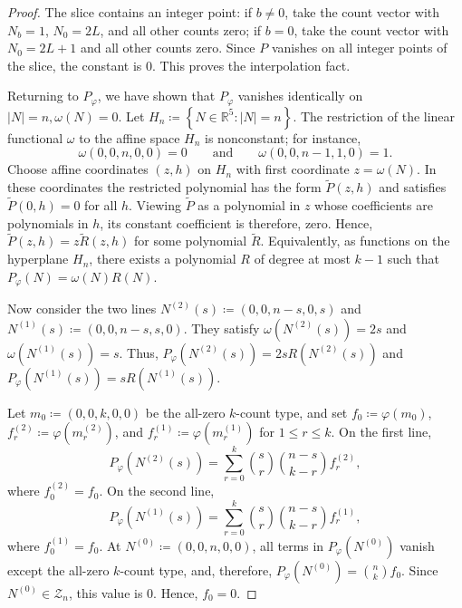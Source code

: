 \documentclass[10pt,a4paper]{amsart}
\begin{document}
\begin{proof}
The slice contains an integer point: if \(b\ne0\), take the count vector with \(N_b=1\), \(N_0=2L\), and all other counts zero; if \(b=0\), take the count vector with \(N_0=2L+1\) and all other counts zero. Since \(P\) vanishes on all integer points of the slice, the constant is \(0\). This proves the interpolation fact.

Returning to \(P_\varphi\), we have shown that \(P_\varphi\) vanishes identically on \(|N|=n,\omega(N)=0\). Let \(H_n\coloneqq\left\{N\in\mathbb R^5\colon |N|=n\right\}\). The restriction of the linear functional \(\omega\) to the affine space \(H_n\) is nonconstant; for instance,
\[
\omega\left(0,0,n,0,0\right)=0
\qquad \text{and} \qquad
\omega\left(0,0,n-1,1,0\right)=1.
\]
Choose affine coordinates \((z,h)\) on \(H_n\) with first coordinate \(z=\omega(N)\). In these coordinates the restricted polynomial has the form \(\tilde P(z,h)\) and satisfies \(\tilde P(0,h)=0\) for all \(h\). Viewing \(\tilde P\) as a polynomial in \(z\) whose coefficients are polynomials in \(h\), its constant coefficient is therefore, zero. Hence, \(\tilde P(z,h)=z\tilde R(z,h)\) for some polynomial \(\tilde R\). Equivalently, as functions on the hyperplane \(H_n\), there exists a polynomial \(R\) of degree at most \(k-1\) such that \(P_\varphi(N)=\omega(N)R(N)\).

Now consider the two lines \(N^{\left(2\right)}\left(s\right)\coloneqq\left(0,0,n-s,0,s\right)\) and \(N^{\left(1\right)}\left(s\right)\coloneqq\left(0,0,n-s,s,0\right)\). They satisfy \(\omega\left(N^{\left(2\right)}\left(s\right)\right)=2s\) and \(\omega\left(N^{\left(1\right)}\left(s\right)\right)=s\). Thus, \(P_\varphi\left(N^{\left(2\right)}\left(s\right)\right)=2sR\left(N^{\left(2\right)}\left(s\right)\right)\) and \(P_\varphi\left(N^{\left(1\right)}\left(s\right)\right)=sR\left(N^{\left(1\right)}\left(s\right)\right)\).

Let \(m_0\coloneqq\left(0,0,k,0,0\right)\) be the all-zero \(k\)-count type, and set \(f_0\coloneqq\varphi\left(m_0\right)\), \(f_r^{\left(2\right)}\coloneqq\varphi\left(m_r^{\left(2\right)}\right)\), and \(f_r^{\left(1\right)}\coloneqq\varphi\left(m_r^{\left(1\right)}\right)\) for \(1\le r\le k\). On the first line,
\[
P_\varphi\left(N^{\left(2\right)}\left(s\right)\right)=\sum_{r=0}^k\binom{s}{r}\binom{n-s}{k-r}f_r^{\left(2\right)},
\]
where \(f_0^{\left(2\right)}=f_0\). On the second line,
\[
P_\varphi\left(N^{\left(1\right)}\left(s\right)\right)=\sum_{r=0}^k\binom{s}{r}\binom{n-s}{k-r}f_r^{\left(1\right)},
\]
where \(f_0^{\left(1\right)}=f_0\). At \(N^{\left(0\right)}\coloneqq\left(0,0,n,0,0\right)\), all terms in \(P_\varphi\left(N^{\left(0\right)}\right)\) vanish except the all-zero \(k\)-count type, and, therefore, \(P_\varphi\left(N^{\left(0\right)}\right)=\binom{n}{k}f_0\). Since \(N^{\left(0\right)}\in\mathcal Z_n\), this value is \(0\). Hence, \(f_0=0\).


\end{proof}
\end{document}
